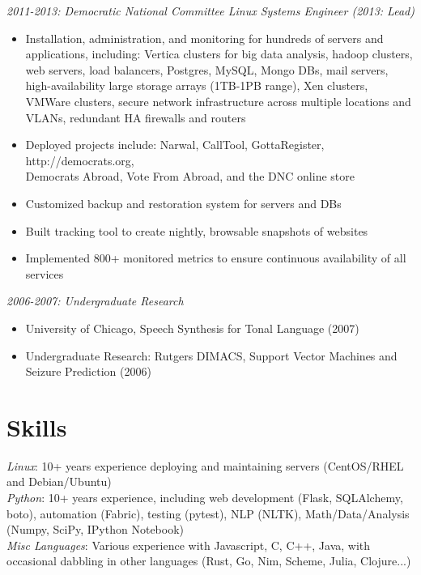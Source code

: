 \documentclass[line]{res} %
\begin{document}
\begin{resume}
    {\sl 2011-2013: Democratic National Committee Linux Systems Engineer (2013: Lead)}
        \begin{itemize}
            \item Installation, administration, and monitoring for hundreds of servers and applications, including: Vertica clusters for big data analysis, hadoop clusters, web servers, load balancers, Postgres, MySQL, Mongo DBs, mail servers, high-availability large storage arrays (1TB-1PB range), Xen clusters, VMWare clusters, secure network infrastructure across multiple locations and VLANs, redundant HA firewalls and routers
            \item Deployed projects include: Narwal, CallTool, GottaRegister, http://democrats.org, \\Democrats Abroad, Vote From Abroad, and the DNC online store
            \item Customized backup and restoration system for servers and DBs
            \item Built tracking tool to create nightly, browsable snapshots of websites
            \item Implemented 800+ monitored metrics to ensure continuous availability of all services
        \end{itemize}

{\sl 2006-2007: Undergraduate Research}
    \begin{itemize} 
        \item University of Chicago, Speech Synthesis for Tonal Language (2007)
        \item Undergraduate Research: Rutgers DIMACS, Support Vector Machines and Seizure Prediction (2006)
    \end{itemize}

\section{Skills}
{\sl Linux}: 10+ years experience deploying and maintaining servers (CentOS/RHEL and Debian/Ubuntu)\\
{\sl Python}: 10+ years experience, including web development (Flask, SQLAlchemy, boto), automation (Fabric), testing (pytest), NLP (NLTK), Math/Data/Analysis (Numpy, SciPy, IPython Notebook) \\
{\sl Misc Languages}: Various experience with Javascript, C, C++, Java, with occasional dabbling in other languages (Rust, Go, Nim, Scheme, Julia, Clojure...)



\end{resume}
\end{document}
